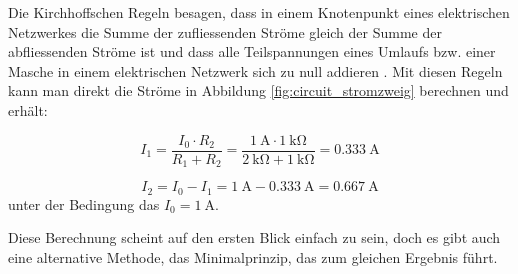 Die Kirchhoffschen Regeln besagen, dass in einem Knotenpunkt eines elektrischen Netzwerkes die Summe der zufliessenden Ströme gleich der Summe der abfliessenden Ströme ist und dass alle Teilspannungen eines Umlaufs bzw. einer Masche in einem elektrischen Netzwerk sich zu null addieren \cite{dewiki:244855415}. Mit diesen Regeln kann man direkt die Ströme in Abbildung \ref{fig:circuit_stromzweig} berechnen und erhält:

\begin{equation}
	I_1 = \frac{I_0 \cdot R_2}{R_1 + R_2} = \frac{\SI{1}{\ampere} \cdot \SI{1}{\kilo\ohm}}{\SI{2}{\kilo\ohm}+ \SI{1}{\kilo\ohm}}=\SI{0.333}{\ampere}
	\label{circuit:current_circuit_power_example3}
\end{equation}

\begin{equation}
	I_2 = I_0-I_1=\SI{1}{\ampere}-\SI{0.333}{\ampere}=\SI{0.667}{\ampere}
	\label{circuit:current_circuit_power4}
\end{equation}
unter der Bedingung das $I_0=\SI{1}{\ampere}$.

Diese Berechnung scheint auf den ersten Blick einfach zu sein, doch es gibt auch eine alternative Methode, das Minimalprinzip, das zum gleichen Ergebnis führt.

